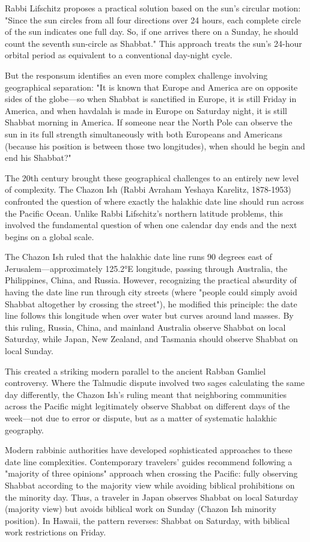 Rabbi Lifschitz proposes a practical solution based on the sun's circular motion: "Since the sun circles from all four directions over 24 hours, each complete circle of the sun indicates one full day. So, if one arrives there on a Sunday, he should count the seventh sun-circle as Shabbat." This approach treats the sun's 24-hour orbital period as equivalent to a conventional day-night cycle.

But the responsum identifies an even more complex challenge involving geographical separation: "It is known that Europe and America are on opposite sides of the globe—so when Shabbat is sanctified in Europe, it is still Friday in America, and when havdalah is made in Europe on Saturday night, it is still Shabbat morning in America. If someone near the North Pole can observe the sun in its full strength simultaneously with both Europeans and Americans (because his position is between those two longitudes), when should he begin and end his Shabbat?"

The 20th century brought these geographical challenges to an entirely new level of complexity. The Chazon Ish (Rabbi Avraham Yeshaya Karelitz, 1878-1953) confronted the question of where exactly the halakhic date line should run across the Pacific Ocean. Unlike Rabbi Lifschitz's northern latitude problems, this involved the fundamental question of when one calendar day ends and the next begins on a global scale.

The Chazon Ish ruled that the halakhic date line runs 90 degrees east of Jerusalem—approximately 125.2°E longitude, passing through Australia, the Philippines, China, and Russia. However, recognizing the practical absurdity of having the date line run through city streets (where "people could simply avoid Shabbat altogether by crossing the street"), he modified this principle: the date line follows this longitude when over water but curves around land masses. By this ruling, Russia, China, and mainland Australia observe Shabbat on local Saturday, while Japan, New Zealand, and Tasmania should observe Shabbat on local Sunday.

This created a striking modern parallel to the ancient Rabban Gamliel controversy. Where the Talmudic dispute involved two sages calculating the same day differently, the Chazon Ish's ruling meant that neighboring communities across the Pacific might legitimately observe Shabbat on different days of the week—not due to error or dispute, but as a matter of systematic halakhic geography.

Modern rabbinic authorities have developed sophisticated approaches to these date line complexities. Contemporary travelers' guides recommend following a "majority of three opinions" approach when crossing the Pacific: fully observing Shabbat according to the majority view while avoiding biblical prohibitions on the minority day. Thus, a traveler in Japan observes Shabbat on local Saturday (majority view) but avoids biblical work on Sunday (Chazon Ish minority position). In Hawaii, the pattern reverses: Shabbat on Saturday, with biblical work restrictions on Friday.

